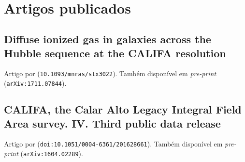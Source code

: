 


\chapter{Artigos publicados}

\section{Diffuse ionized gas in galaxies across the Hubble sequence at the CALIFA resolution}
\label{apendice:DIGpaper0}

Artigo por \cite{Lacerda.etal.2018} (\texttt{10.1093/mnras/stx3022}).
Também disponível em {\em pre-print} (\texttt{arXiv:1711.07844}).

\cleardoublepage



\section{CALIFA, the Calar Alto Legacy Integral Field Area survey. IV. Third public data release}
\label{apendice:SFSanchezDR3}

Artigo por \cite{SFSanchez.DR3.2016} (\texttt{doi:10.1051/0004-6361/201628661}).
Também disponível em {\em pre-print} (\texttt{arXiv:1604.02289}).

\cleardoublepage



